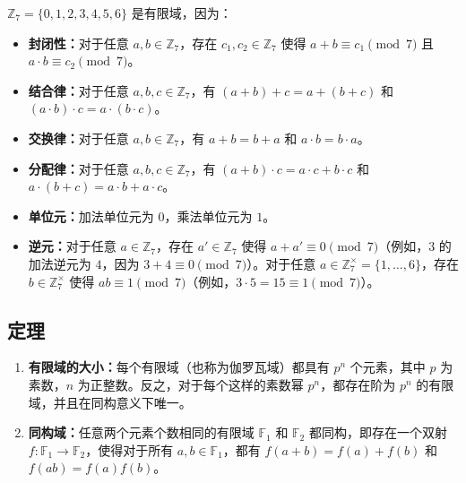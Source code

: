 \noindent $\mathbb{Z}_7 = \{0, 1, 2, 3, 4, 5, 6\}$ 是有限域，因为：
\begin{itemize}
\item \textbf{封闭性：}对于任意 $a,b \in \mathbb{Z}_7$，存在 $c_1,c_2 \in \mathbb{Z}_7$ 使得 $a+b \equiv c_1 \pmod{7}$ 且 $a\cdot b \equiv c_2 \pmod{7}$。
\item \textbf{结合律：}对于任意 $a,b,c \in \mathbb{Z}_7$，有 $(a+b)+c=a+(b+c)$ 和 $(a\cdot b)\cdot c=a\cdot(b\cdot c)$。
\item \textbf{交换律：}对于任意 $a,b \in \mathbb{Z}_7$，有 $a+b=b+a$ 和 $a\cdot b=b\cdot a$。
\item \textbf{分配律：}对于任意 $a,b,c \in \mathbb{Z}_7$，有 $(a+b)\cdot c=a\cdot c+b\cdot c$ 和 $a\cdot(b+c)=a\cdot b+a\cdot c$。
\item \textbf{单位元：}加法单位元为 $0$，乘法单位元为 $1$。
\item \textbf{逆元：}对于任意 $a \in \mathbb{Z}_7$，存在 $a' \in \mathbb{Z}_7$ 使得 $a+a' \equiv 0 \pmod{7}$（例如，$3$ 的加法逆元为 $4$，因为 $3+4\equiv0 \pmod{7}$）。对于任意 $a \in \mathbb{Z}_7^\times=\{1,\dots,6\}$，存在 $b \in \mathbb{Z}_7^{\times}$ 使得 $ab \equiv 1 \pmod{7}$（例如，$3\cdot5=15\equiv1 \pmod{7}$）。
\end{itemize}

\subsection{定理}
\label{subsec:field-theorem}

\begin{tcolorbox}[title={\textbf{\tboxtheorem{\ref*{subsec:field-theorem}} 域的相关定理}}]
\begin{enumerate}
\item \textbf{有限域的大小：}每个有限域（也称为伽罗瓦域）都具有 $p^n$ 个元素，其中 $p$ 为素数，$n$ 为正整数。反之，对于每个这样的素数幂 $p^n$，都存在阶为 $p^n$ 的有限域，并且在同构意义下唯一。
\item \textbf{同构域：}任意两个元素个数相同的有限域 $\mathbb{F}_1$ 和 $\mathbb{F}_2$ 都同构，即存在一个双射 $f:\mathbb{F}_1\to\mathbb{F}_2$，使得对于所有 $a,b\in\mathbb{F}_1$，都有 $f(a+b)=f(a)+f(b)$ 和 $f(ab)=f(a)f(b)$。
\end{enumerate}
\end{tcolorbox}
